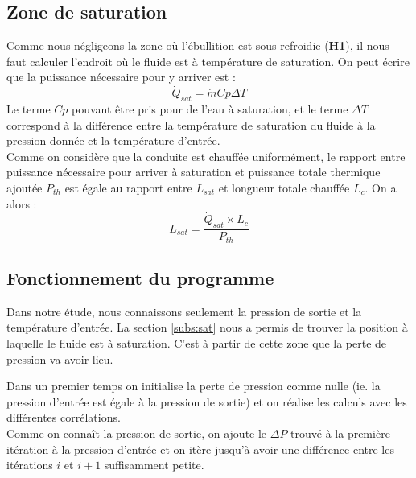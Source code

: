 \subsection{Zone de saturation\label{subs:sat}}
Comme nous négligeons la zone où l'ébullition est sous-refroidie (\textbf{H1}), il nous faut calculer l'endroit où le fluide est à température de saturation. On peut écrire que la puissance nécessaire pour y arriver est :
\begin{equation}
    \dot{Q}_{sat} = \dot{m} Cp \Delta T
\end{equation}
Le terme $Cp$ pouvant être pris pour de l'eau à saturation, et le terme $\Delta T$ correspond à la différence entre la température de saturation du fluide à la pression donnée et la température d'entrée.\\ 
Comme on considère que la conduite est chauffée uniformément, le rapport entre puissance nécessaire pour arriver à saturation et puissance totale thermique ajoutée $P_{th}$ est égale au rapport entre $L_{sat}$ et longueur totale chauffée $L_c$. On a alors :
\begin{equation}
    L_{sat}= \frac{ \dot{Q}_{sat}\times L_c}{P_{th}}
\end{equation}
\par
\subsection{Fonctionnement du programme}
Dans notre étude, nous connaissons seulement la pression de sortie et la température d'entrée. La section \ref{subs:sat} nous a permis de trouver la position à laquelle le fluide est à saturation. C'est à partir de cette zone que la perte de pression va avoir lieu. \\ \par
Dans un premier temps on initialise la perte de pression comme nulle (ie. la pression d'entrée est égale à la pression de sortie) et on réalise les calculs avec les différentes corrélations. \\
Comme on connaît la pression de sortie, on ajoute le $\Delta P$ trouvé à la première itération à la pression d'entrée et on itère jusqu'à avoir une différence entre les itérations $i$ et $i+1$ suffisamment petite.